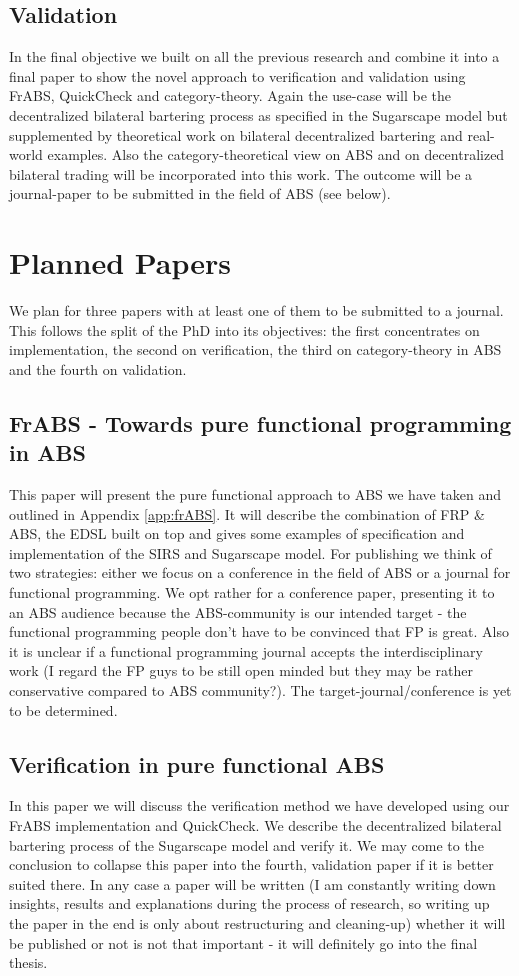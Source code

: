 \subsection{Validation}
In the final objective we built on all the previous research and combine it into a final paper to show the novel approach to verification and validation using FrABS, QuickCheck and category-theory. Again the use-case will be the decentralized bilateral bartering process as specified in the Sugarscape model but supplemented by theoretical work on bilateral decentralized bartering and real-world examples. Also the category-theoretical view on ABS and on decentralized bilateral trading will be incorporated into this work. The outcome will be a journal-paper to be submitted in the field of ABS (see below).

\section{Planned Papers}
We plan for three papers with at least one of them to be submitted to a journal. This follows the split of the PhD into its objectives: the first concentrates on implementation, the second on verification, the third on category-theory in ABS and the fourth on validation. 

\subsection{FrABS - Towards pure functional programming in ABS}
This paper will present the pure functional approach to ABS we have taken and outlined in Appendix \ref{app:frABS}. It will describe the combination of FRP \& ABS, the EDSL built on top and gives some examples of specification and implementation of the SIRS and Sugarscape model.
For publishing we think of two strategies: either we focus on a conference in the field of ABS or a journal for functional programming. We opt rather for a conference paper, presenting it to an ABS audience because the ABS-community is our intended target - the functional programming people don't have to be convinced that FP is great. Also it is unclear if a functional programming journal accepts the interdisciplinary work (I regard the FP guys to be still open minded but they may be rather conservative compared to ABS community?). The target-journal/conference is yet to be determined.

\subsection{Verification in pure functional ABS}
In this paper we will discuss the verification method we have developed using our FrABS implementation and QuickCheck. We describe the decentralized bilateral bartering process of the Sugarscape model and verify it.
We may come to the conclusion to collapse this paper into the fourth, validation paper if it is better suited there. In any case a paper will be written (I am constantly writing down insights, results and explanations during the process of research, so writing up the paper in the end is only about restructuring and cleaning-up) whether it will be published or not is not that important - it will definitely go into the final thesis.

